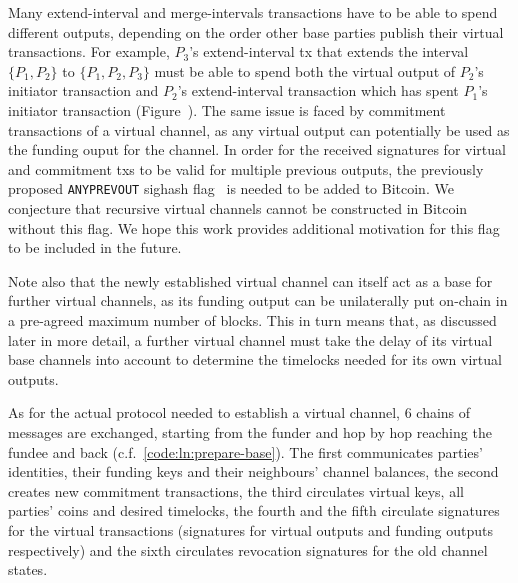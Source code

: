   Many extend-interval and merge-intervals transactions have to be able to spend
  different outputs, depending on the order other base parties publish their
  virtual transactions. For example, $P_3$'s extend-interval tx that extends the
  interval $\{P_1, P_2\}$ to $\{P_1, P_2, P_3\}$ must be able to spend both
  the virtual output of $P_2$'s initiator transaction and $P_2$'s
  extend-interval transaction which has spent $P_1$'s initiator transaction
  (Figure~\TODO{}). The same issue is faced by commitment transactions of
  a virtual channel, as any virtual output can potentially be used as the
  funding ouput for the channel. In order for the received signatures for
  virtual and commitment txs to be valid for multiple previous outputs, the
  previously proposed \texttt{ANYPREVOUT} sighash flag~\cite{anyprevout} is
  needed to be added to Bitcoin. We conjecture that recursive virtual channels
  cannot be constructed in Bitcoin without this flag. We hope this work provides
  additional motivation for this flag to be included in the future.

  Note also that the newly established virtual channel can itself act as a base
  for further virtual channels, as its funding output can be unilaterally put
  on-chain in a pre-agreed maximum number of blocks. This in turn means that, as
  discussed later in more detail, a further virtual channel must take the delay
  of its virtual base channels into account to determine the timelocks needed
  for its own virtual outputs.

  As for the actual protocol needed to establish a virtual channel, $6$ chains
  of messages are exchanged, starting from the funder and hop by hop reaching
  the fundee and back (c.f.~\ref{code:ln:prepare-base}). The first communicates
  parties' identities, their funding keys and their neighbours' channel
  balances, the second creates new commitment transactions, the third circulates
  virtual keys, all parties' coins and desired timelocks, the fourth and the
  fifth circulate signatures for the virtual transactions (signatures for
  virtual outputs and funding outputs respectively) and the sixth circulates
  revocation signatures for the old channel states.
